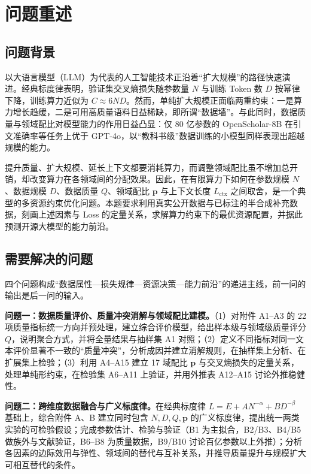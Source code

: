 \section{问题重述}

\subsection{问题背景}

以大语言模型（LLM）为代表的人工智能技术正沿着“扩大规模”的路径快速演进。经典标度律\cite{kaplan2020scaling,hoffmann2022compute}表明，验证集交叉熵损失随参数量 $N$ 与训练 Token 数 $D$ 按幂律下降，训练算力近似为 $C\approx 6ND$。然而，单纯扩大规模正面临两重约束：一是算力增长趋缓，二是可用高质量语料日益稀缺，即所谓“数据墙”\cite{villalobos2024rundata,muennighoff2023dataconstrained}。与此同时，数据质量与领域配比对模型能力的作用日益凸显：仅 80 亿参数的 OpenScholar-8B 在引文准确率等任务上优于 GPT-4o\cite{asai2026openscholar}，以“教科书级”数据训练的小模型同样表现出超越规模的能力\cite{gunasekar2023textbooks}。

提升质量、扩大规模、延长上下文都要消耗算力，而调整领域配比虽不增加总开销，却改变算力在各领域间的分配效果。因此，在有限算力下如何在参数规模 $N$、数据规模 $D$、数据质量 $Q$、领域配比 $\boldsymbol p$ 与上下文长度 $L_{\mathrm{ctx}}$ 之间取舍，是一个典型的多资源约束优化问题。本题要求利用真实公开数据与已标注的半合成补充数据，刻画上述因素与 Loss 的定量关系，求解算力约束下的最优资源配置，并据此预测开源大模型的能力前沿。

\subsection{需要解决的问题}

四个问题构成“数据属性—损失规律—资源决策—能力前沿”的递进主线，前一问的输出是后一问的输入。

\textbf{问题一：数据质量评价、质量冲突消解与领域配比建模。}（1）对附件 A1--A3 的 22 项质量指标统一方向并预处理，建立综合评价模型，给出样本级与领域级质量评分 $Q$，说明聚合方式，并将全量结果与抽样集 A1 对照；（2）定义不同指标对同一文本评价显著不一致的“质量冲突”，分析成因并建立消解规则，在抽样集上分析、在扩展集上检验；（3）利用 A4--A15 建立 17 域配比 $\boldsymbol p$ 与交叉熵损失的定量关系，处理单纯形约束，在检验集 A6--A11 上验证，并用外推表 A12--A15 讨论外推稳健性。

\textbf{问题二：跨维度数据融合与广义标度律。}在经典标度律 $L=E+AN^{-\alpha}+BD^{-\beta}$ 基础上，综合附件 A、B 建立同时包含 $N,D,Q,\boldsymbol p$ 的广义标度律，提出统一两类实验的可检验假设；完成参数估计、检验与验证（B1 为主拟合，B2/B3、B4/B5 做族外与文献验证，B6--B8 为质量数据，B9/B10 讨论百亿参数以上外推）；分析各因素的边际效用与弹性、领域间的替代与互补关系，并推导质量提升与规模扩大可相互替代的条件。

